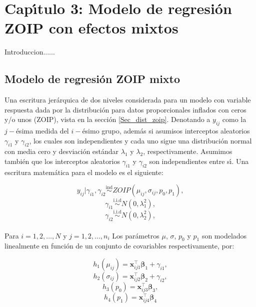 \chapter{Cap\'{\i}tulo 3: Modelo de regresi\'{o}n ZOIP con efectos mixtos}

Introduccion......


\section{Modelo de regresi\'{o}n ZOIP mixto}


Una escritura jer\'{a}rquica de dos niveles considerada para un modelo con variable respuesta dada por la distribuci\'{o}n para datos proporcionales inflados con ceros y/o unos (ZOIP), vista en la secci\'{o}n \ref{Sec_dist_zoip}. Denotando a $y_{ij}$ como la $j-$\'{e}sima medida del $i-$\'{e}simo grupo, adem\'{a}s si asumisos interceptos aleatorios $\gamma_{i1}$ y $\gamma_{i2}$, los cuales son independientes y cada uno sigue una distribuci\'{o}n normal con media cero y desviaci\'{o}n est\'{a}ndar $\lambda_1$ y $\lambda_2$, respectivamente. Asumimos tambi\'{e}n que los interceptos aleatorios $\gamma_{i1}$ y $\gamma_{i2}$ son independientes entre s\'{\i}. Una escritura matem\'{a}tica para el modelo es el siguiente:

\[
y_{ij}| \gamma_{i1},\gamma_{i2} \overset{\text{ind}}{\sim} ZOIP(\mu_{ij},\sigma_{ij},p_0, p_1),
\]
\[
\gamma_{i1} \overset{\text{i.i.d}}{\sim}  N(0,\lambda_1^2),
\]
\[
\gamma_{i2} \overset{\text{i.i.d}}{\sim}  N(0,\lambda_2^2),
\]
\\
Para $i=1,2,\ldots, N$ y $j=1,2,\ldots, n_i$ Los par\'{a}metros $\mu$, $\sigma$, $p_0$ y $p_1$ son modelados linealmente en funci\'{o}n de un conjunto de covariables respectivamente, por:


\[
h_1(\mu_{ij})=\mathbf{x}_{ij1}^{\top} \boldsymbol{\beta}_1+ \gamma_{i1},
\]
\[
h_2(\sigma_{ij})=\mathbf{x}_{ij2}^{\top} \boldsymbol{\beta}_2+ \gamma_{i2},
\]
\[
h_3(p_0)=\mathbf{x}_{ij3}^{\top} \boldsymbol{\beta}_3,
\]
\[
h_4(p_1)=\mathbf{x}_{ij4}^{\top} \boldsymbol{\beta}_4
\]


